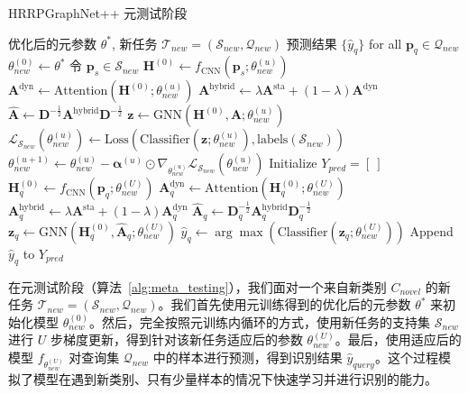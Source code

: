\begin{algorithm}[htbp]
\caption{HRRPGraphNet++ 元测试阶段}
\label{alg:meta_testing}
\begin{algorithmic}[1]
    \REQUIRE 优化后的元参数 $\theta^*$, 新任务 $\mathcal{T}_{new} = (\mathcal{S}_{new}, \mathcal{Q}_{new})$
    \ENSURE 预测结果 $\{\hat{y}_q\}$ for all $\mathbf{p}_q \in \mathcal{Q}_{new}$
    \STATE $\theta_{new}^{(0)} \leftarrow \theta^*$ %
        \STATE 令 $\mathbf{p}_s \in \mathcal{S}_{new}$
        \STATE $\mathbf{H}^{(0)} \leftarrow f_{\text{CNN}}(\mathbf{p}_s; \theta_{new}^{(u)})$
        \STATE $\mathbf{A}^{\text{dyn}} \leftarrow \text{Attention}(\mathbf{H}^{(0)}; \theta_{new}^{(u)})$
        \STATE $\mathbf{A}^{\text{hybrid}} \leftarrow \lambda \mathbf{A}^{\text{sta}} + (1-\lambda) \mathbf{A}^{\text{dyn}}$
        \STATE $\hat{\mathbf{A}} \leftarrow \mathbf{D}^{-\frac{1}{2}} \mathbf{A}^{\text{hybrid}} \mathbf{D}^{-\frac{1}{2}}$
        \STATE $\mathbf{z} \leftarrow \text{GNN}(\mathbf{H}^{(0)}, \hat{\mathbf{A}}; \theta_{new}^{(u)})$
        \STATE $\mathcal{L}_{\mathcal{S}_{new}}(\theta_{new}^{(u)}) \leftarrow \text{Loss}( \text{Classifier}(\mathbf{z}; \theta_{new}^{(u)}), \text{labels}(\mathcal{S}_{new}) )$
        \STATE $\theta_{new}^{(u+1)} \leftarrow \theta_{new}^{(u)} - \boldsymbol{\alpha}^{(u)} \odot \nabla_{\theta_{new}^{(u)}} \mathcal{L}_{\mathcal{S}_{new}}(\theta_{new}^{(u)})$ %
    \ENDFOR
    \STATE %
    \STATE Initialize $Y_{pred} = [~]$
        \STATE $\mathbf{H}_q^{(0)} \leftarrow f_{\text{CNN}}(\mathbf{p}_q; \theta_{new}^{(U)})$
        \STATE $\mathbf{A}_q^{\text{dyn}} \leftarrow \text{Attention}(\mathbf{H}_q^{(0)}; \theta_{new}^{(U)})$
        \STATE $\mathbf{A}_q^{\text{hybrid}} \leftarrow \lambda \mathbf{A}^{\text{sta}} + (1-\lambda) \mathbf{A}_q^{\text{dyn}}$
        \STATE $\hat{\mathbf{A}}_q \leftarrow \mathbf{D}_q^{-\frac{1}{2}} \mathbf{A}_q^{\text{hybrid}} \mathbf{D}_q^{-\frac{1}{2}}$
        \STATE $\mathbf{z}_q \leftarrow \text{GNN}(\mathbf{H}_q^{(0)}, \hat{\mathbf{A}}_q; \theta_{new}^{(U)})$
        \STATE $\hat{y}_q \leftarrow \arg\max (\text{Classifier}(\mathbf{z}_q; \theta_{new}^{(U)}))$
        \STATE Append $\hat{y}_q$ to $Y_{pred}$
    \ENDFOR
\end{algorithmic}
\end{algorithm}
在元测试阶段（算法~\ref{alg:meta_testing}），我们面对一个来自新类别 $C_{novel}$ 的新任务 $\mathcal{T}_{new} = (\mathcal{S}_{new}, \mathcal{Q}_{new})$。我们首先使用元训练得到的优化后的元参数 $\theta^*$ 来初始化模型 $\theta_{new}^{(0)}$。然后，完全按照元训练内循环的方式，使用新任务的支持集 $\mathcal{S}_{new}$ 进行 $U$ 步梯度更新，得到针对该新任务适应后的参数 $\theta_{new}^{(U)}$。最后，使用适应后的模型 $f_{\theta_{new}^{(U)}}$ 对查询集 $\mathcal{Q}_{new}$ 中的样本进行预测，得到识别结果 $\hat{y}_{query}$。这个过程模拟了模型在遇到新类别、只有少量样本的情况下快速学习并进行识别的能力。

